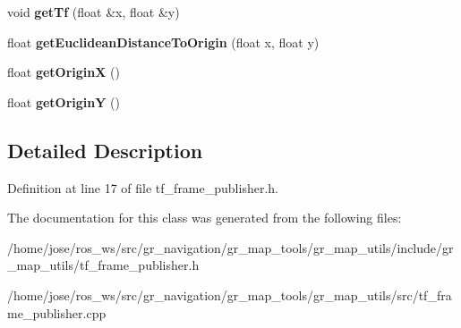 \begin{DoxyCompactItemize}
\mbox{\label{classgr__map__utils_1_1TfFramePublisher_a4d866fff6e347d0524fab873287c4634}} 
void {\bfseries get\+Tf} (float \&x, float \&y)
\item 
\mbox{\label{classgr__map__utils_1_1TfFramePublisher_afc6c053bf5266f443e6fd8f763dd1787}} 
float {\bfseries get\+Euclidean\+Distance\+To\+Origin} (float x, float y)
\item 
\mbox{\label{classgr__map__utils_1_1TfFramePublisher_ac68ac5a148db526370bd18f8ebdff6f5}} 
float {\bfseries get\+OriginX} ()
\item 
\mbox{\label{classgr__map__utils_1_1TfFramePublisher_ad656b0e7602159baa7253f5720983f6d}} 
float {\bfseries get\+OriginY} ()
\end{DoxyCompactItemize}


\subsection{Detailed Description}


Definition at line 17 of file tf\+\_\+frame\+\_\+publisher.\+h.



The documentation for this class was generated from the following files\+:\begin{DoxyCompactItemize}
\item 
/home/jose/ros\+\_\+ws/src/gr\+\_\+navigation/gr\+\_\+map\+\_\+tools/gr\+\_\+map\+\_\+utils/include/gr\+\_\+map\+\_\+utils/tf\+\_\+frame\+\_\+publisher.\+h\item 
/home/jose/ros\+\_\+ws/src/gr\+\_\+navigation/gr\+\_\+map\+\_\+tools/gr\+\_\+map\+\_\+utils/src/tf\+\_\+frame\+\_\+publisher.\+cpp\end{DoxyCompactItemize}

